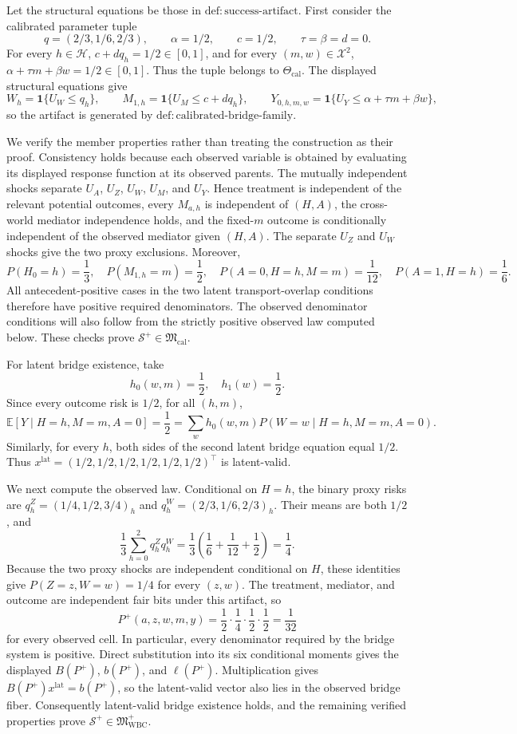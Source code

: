 Let the structural equations be those in \(\mathrm{def{:}success\text{-}artifact}\).  First consider the calibrated parameter tuple
\[
 q=(2/3,1/6,2/3),\qquad \alpha=1/2,\qquad c=1/2,
 \qquad \tau=\beta=d=0.
\]
For every \(h\in\mathcal H\), \(c+dq_h=1/2\in[0,1]\), and for every
\((m,w)\in\mathcal X^2\), \(\alpha+\tau m+\beta w=1/2\in[0,1]\).
Thus the tuple belongs to \(\Theta_{\mathrm{cal}}\).  The displayed structural
equations give
\[
 W_h=\mathbf 1\{U_W\le q_h\},\qquad
 M_{1,h}=\mathbf 1\{U_M\le c+dq_h\},\qquad
 Y_{0,h,m,w}=\mathbf 1\{U_Y\le\alpha+\tau m+\beta w\},
\]
so the artifact is generated by \(\mathrm{def{:}calibrated\text{-}bridge\text{-}family}\).

We verify the member properties rather than treating the construction as their
proof.  Consistency holds because each observed variable is obtained by evaluating
its displayed response function at its observed parents.  The mutually independent
shocks separate \(U_A\), \(U_Z\), \(U_W\), \(U_M\), and \(U_Y\).  Hence treatment is
independent of the relevant potential outcomes, every \(M_{a,h}\) is independent of
\((H,A)\), the cross-world mediator independence holds, and the fixed-\(m\) outcome
is conditionally independent of the observed mediator given \((H,A)\).  The separate
\(U_Z\) and \(U_W\) shocks give the two proxy exclusions.  Moreover,
\[
 P(H_0=h)=\frac13,\quad P(M_{1,h}=m)=\frac12,\quad
 P(A=0,H=h,M=m)=\frac1{12},\quad P(A=1,H=h)=\frac16.
\]
All antecedent-positive cases in the two latent transport-overlap conditions
therefore have positive required denominators.  The observed denominator conditions
will also follow from the strictly positive observed law computed below.  These
checks prove \(\mathcal S^+\in\mathfrak M_{\mathrm{cal}}\).

For latent bridge existence, take
\[
 h_0(w,m)=\frac12,\quad h_1(w)=\frac12.
\]
Since every outcome risk is \(1/2\), for all \((h,m)\),
\[
 \mathbb E[Y\mid H=h,M=m,A=0]=\frac12
 =\sum_w h_0(w,m)P(W=w\mid H=h,M=m,A=0).
\]
Similarly, for every \(h\), both sides of the second latent bridge equation equal
\(1/2\).  Thus \(x^{\mathrm{lat}}=(1/2,1/2,1/2,1/2,1/2,1/2)^\top\) is latent-valid.

We next compute the observed law.  Conditional on \(H=h\), the binary proxy risks
are \(q_h^Z=(1/4,1/2,3/4)_h\) and
\(q_h^W=(2/3,1/6,2/3)_h\).  Their means are both \(1/2\), and
\[
 \frac13\sum_{h=0}^2q_h^Zq_h^W
 =\frac13\left(\frac16+\frac1{12}+\frac12\right)=\frac14.
\]
Because the two proxy shocks are independent conditional on \(H\), these identities
give \(P(Z=z,W=w)=1/4\) for every \((z,w)\).  The treatment, mediator, and outcome
are independent fair bits under this artifact, so
\[
 P^+(a,z,w,m,y)=\frac12\cdot\frac14\cdot\frac12\cdot\frac12
 =\frac1{32}
\]
for every observed cell.  In particular, every denominator required by the bridge
system is positive.  Direct substitution into its six conditional moments gives
the displayed \(B(P^+)\), \(b(P^+)\), and \(\ell(P^+)\).  Multiplication gives
\(B(P^+)x^{\mathrm{lat}}=b(P^+)\), so the latent-valid vector also lies in the
observed bridge fiber.  Consequently latent-valid bridge existence holds, and the
remaining verified properties prove
\(\mathcal S^+\in\mathfrak M_{\mathrm{WBC}}^+\).

